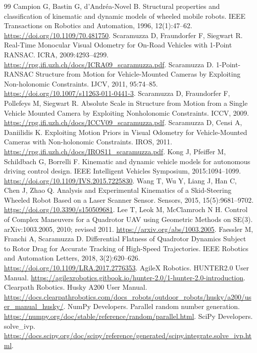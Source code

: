 \documentclass[UTF8,a4paper,fontset=fandol,11pt]{ctexart}
\begin{document}
\begin{thebibliography}{99}
 Campion G, Bastin G, d'Andr\'ea-Novel B.
Structural properties and classification of kinematic and dynamic models of wheeled mobile robots.
IEEE Transactions on Robotics and Automation, 1996, 12(1):47--62.
\url{https://doi.org/10.1109/70.481750}.
 Scaramuzza D, Fraundorfer F, Siegwart R.
Real-Time Monocular Visual Odometry for On-Road Vehicles with 1-Point RANSAC.
ICRA, 2009:4293--4299. \url{https://rpg.ifi.uzh.ch/docs/ICRA09_scaramuzza.pdf}.
 Scaramuzza D.
1-Point-RANSAC Structure from Motion for Vehicle-Mounted Cameras by Exploiting Non-holonomic Constraints.
IJCV, 2011, 95:74--85. \url{https://doi.org/10.1007/s11263-011-0441-3}.
 Scaramuzza D, Fraundorfer F, Pollefeys M, Siegwart R.
Absolute Scale in Structure from Motion from a Single Vehicle Mounted Camera by Exploiting Nonholonomic Constraints.
ICCV, 2009. \url{https://rpg.ifi.uzh.ch/docs/ICCV09_scaramuzza.pdf}.
 Scaramuzza D, Censi A, Daniilidis K.
Exploiting Motion Priors in Visual Odometry for Vehicle-Mounted Cameras with Non-holonomic Constraints.
IROS, 2011. \url{https://rpg.ifi.uzh.ch/docs/IROS11_scaramuzza.pdf}.
 Kong J, Pfeiffer M, Schildbach G, Borrelli F.
Kinematic and dynamic vehicle models for autonomous driving control design.
IEEE Intelligent Vehicles Symposium, 2015:1094--1099.
\url{https://doi.org/10.1109/IVS.2015.7225830}.
 Wang T, Wu Y, Liang J, Han C, Chen J, Zhao Q.
Analysis and Experimental Kinematics of a Skid-Steering Wheeled Robot Based on a Laser Scanner Sensor.
Sensors, 2015, 15(5):9681--9702. \url{https://doi.org/10.3390/s150509681}.
 Lee T, Leok M, McClamroch N H.
Control of Complex Maneuvers for a Quadrotor UAV using Geometric Methods on SE(3).
arXiv:1003.2005, 2010; revised 2011. \url{https://arxiv.org/abs/1003.2005}.
 Faessler M, Franchi A, Scaramuzza D.
Differential Flatness of Quadrotor Dynamics Subject to Rotor Drag for Accurate Tracking of High-Speed Trajectories.
IEEE Robotics and Automation Letters, 2018, 3(2):620--626.
\url{https://doi.org/10.1109/LRA.2017.2776353}.
 AgileX Robotics. HUNTER2.0 User Manual.
\url{https://agilexrobotics.gitbook.io/hunter-2.0/1-hunter-2.0-introduction}.
 Clearpath Robotics. Husky A200 User Manual.
\url{https://docs.clearpathrobotics.com/docs_robots/outdoor_robots/husky/a200/user_manual_husky/}.
 NumPy Developers. Parallel random number generation.
\url{https://numpy.org/doc/stable/reference/random/parallel.html}.
 SciPy Developers. solve\_ivp.
\url{https://docs.scipy.org/doc/scipy/reference/generated/scipy.integrate.solve_ivp.html}.
\end{thebibliography}
\end{document}
